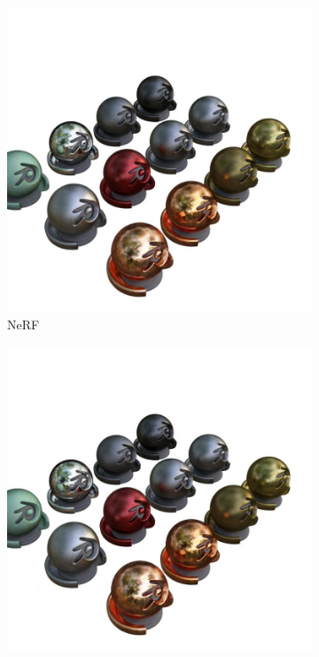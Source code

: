 \documentclass[12pt, a4paper, twoside]{book}
\numberwithin{equation}{chapter}
\numberwithin{theorem}{section}
\numberwithin{definition}{section}
\numberwithin{definitionChapter}{chapter}
\begin{document}
\begin{figure}[H]
\begin{subfigure}{0.475\textwidth}
			\includegraphics[scale=0.25]{img/nerf/nerf_materials_36.jpg}
			\caption{NeRF}
		\end{subfigure}
		\begin{subfigure}{0.475\textwidth}
			\centering
			\includegraphics[scale=0.25]{img/mipnerf/mipnerf_materials_36.jpg}

\end{subfigure}
\end{figure}
\end{document}
